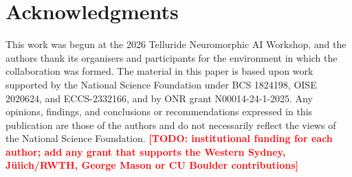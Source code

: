 \documentclass[conference]{IEEEtran}
\newcommand{\todo}[1]{\textcolor{red}{\textbf{[TODO: #1]}}}
\begin{document}
\section*{Acknowledgments}
This work was begun at the 2026 Telluride Neuromorphic AI Workshop, and
the authors thank its organisers and participants for the environment in
which the collaboration was formed. The material in this paper is based
upon work supported by the National Science Foundation under BCS 1824198,
OISE 2020624, and ECCS-2332166, and by ONR grant N00014-24-1-2025. Any
opinions, findings, and conclusions or recommendations expressed in this
publication are those of the authors and do not necessarily reflect the
views of the National Science Foundation.
\todo{institutional funding for each author; add any grant that supports
the Western Sydney, J{\"u}lich/RWTH, George Mason or CU Boulder
contributions}



\end{document}
